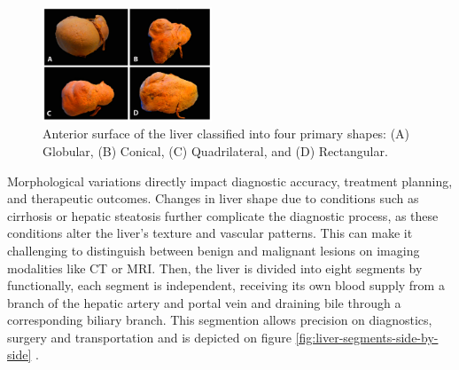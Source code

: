 \begin{figure}[ht]
	\centering
	\includegraphics[width=0.45\textwidth]{assets/diagnostics-13-02371-g001.png} %
	\caption{Anterior surface of the liver classified into four primary shapes: (A) Globular, (B) Conical, (C) Quadrilateral, and (D) Rectangular.}
	\label{fig:liver-shapes}
\end{figure}

Morphological variations directly impact diagnostic accuracy, treatment planning, and therapeutic outcomes. Changes in liver shape due to conditions such as cirrhosis or hepatic steatosis further complicate the diagnostic process, as these conditions alter the liver’s texture and vascular patterns. This can make it challenging to distinguish between benign and malignant lesions on imaging modalities like CT or MRI. Then, the liver is divided into eight segments by functionally, each segment is independent, receiving its own blood supply from a branch of the hepatic artery and portal vein and draining bile through a corresponding biliary branch. This segmention allows precision on diagnostics, surgery and transportation and is depicted on figure \ref{fig:liver-segments-side-by-side} \cite{diagnostics13142371}.


